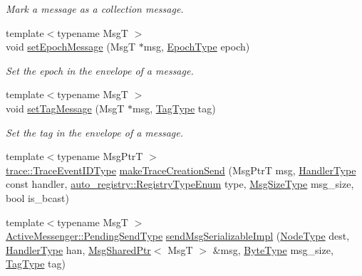 \begin{DoxyCompactItemize}
\begin{DoxyCompactList}\small\item\em Mark a message as a collection message. \end{DoxyCompactList}\item 
{\footnotesize template$<$typename MsgT $>$ }\\void \hyperlink{structvt_1_1messaging_1_1_active_messenger_a5fc9cb79e5cbef41007d847964c17113}{set\+Epoch\+Message} (MsgT $\ast$msg, \hyperlink{namespacevt_a985a5adf291c34a3ca263b3378388236}{Epoch\+Type} epoch)
\begin{DoxyCompactList}\small\item\em Set the epoch in the envelope of a message. \end{DoxyCompactList}\item 
{\footnotesize template$<$typename MsgT $>$ }\\void \hyperlink{structvt_1_1messaging_1_1_active_messenger_ab6d3637cb3c416b3491b748aaf4bab48}{set\+Tag\+Message} (MsgT $\ast$msg, \hyperlink{namespacevt_a84ab281dae04a52a4b243d6bf62d0e52}{Tag\+Type} tag)
\begin{DoxyCompactList}\small\item\em Set the tag in the envelope of a message. \end{DoxyCompactList}\item 
{\footnotesize template$<$typename Msg\+PtrT $>$ }\\\hyperlink{namespacevt_1_1trace_a64a7185f3e102df8d8258f263ccd1582}{trace\+::\+Trace\+Event\+I\+D\+Type} \hyperlink{structvt_1_1messaging_1_1_active_messenger_a527858e860bb7b373489ae425fd3fdcc}{make\+Trace\+Creation\+Send} (Msg\+PtrT msg, \hyperlink{namespacevt_af64846b57dfcaf104da3ef6967917573}{Handler\+Type} const handler, \hyperlink{namespacevt_1_1auto__registry_a9f369ca2b484130b396729e2ddf05241}{auto\+\_\+registry\+::\+Registry\+Type\+Enum} type, \hyperlink{namespacevt_a408e86a8c7c89309b52907dc5a513924}{Msg\+Size\+Type} msg\+\_\+size, bool is\+\_\+bcast)
\item 
{\footnotesize template$<$typename MsgT $>$ }\\\hyperlink{structvt_1_1messaging_1_1_active_messenger_a3626a6ca76d8ad4ec7c3b47a2c70d3a8}{Active\+Messenger\+::\+Pending\+Send\+Type} \hyperlink{structvt_1_1messaging_1_1_active_messenger_a957903699d6ab76b0cf39833c777772e}{send\+Msg\+Serializable\+Impl} (\hyperlink{namespacevt_a866da9d0efc19c0a1ce79e9e492f47e2}{Node\+Type} dest, \hyperlink{namespacevt_af64846b57dfcaf104da3ef6967917573}{Handler\+Type} han, \hyperlink{structvt_1_1messaging_1_1_msg_shared_ptr}{Msg\+Shared\+Ptr}$<$ MsgT $>$ \&msg, \hyperlink{namespacevt_aab8d55968084610ce3b17057981e9300}{Byte\+Type} msg\+\_\+size, \hyperlink{namespacevt_a84ab281dae04a52a4b243d6bf62d0e52}{Tag\+Type} tag)

\end{DoxyCompactItemize}
